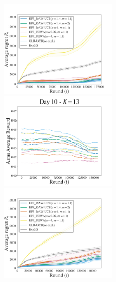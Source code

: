 \begin{figure}[p!]
\includegraphics[clip, width= 0.495\textwidth]{4Restless/fig/DAY9.pdf}
\includegraphics[clip, width= 0.495\textwidth]{4Restless/fig/reward_plot_day10.pdf}
\includegraphics[clip, width= 0.495\textwidth]{4Restless/fig/DAY10.pdf}
\end{figure}
